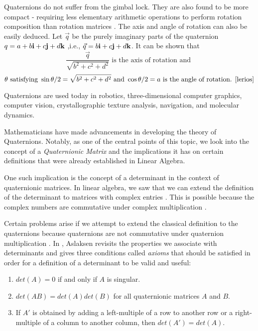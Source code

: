 
Quaternions do not suffer from the gimbal lock. They are also found to be more compact - requiring less elementary arithmetic operations to perform rotation composition than rotation matrices \cite{lerios}. The axis and angle of rotation can also be easily deduced. Let $\vec{q}$ be the purely imaginary parts of the quaternion $q = a + b\textbf{i} + c\textbf{j} + d\textbf{k} $ ,i.e., $\vec{q} = b\textbf{i} + c\textbf{j} + d\textbf{k}$. It can be shown that $$\frac{\vec{q}}{\sqrt{b^2+c^2+d^2}} \text{ is the axis of rotation and }$$ $$\theta \text{ satisfying } \sin{\theta/2} = \sqrt{b^2+c^2+d^2} \text{ and } \cos{\theta/2} = a \text{ is the angle of rotation. \cite{lerios}}$$

Quaternions are used today in robotics, three-dimensional computer graphics, computer vision, crystallographic texture analysis, navigation, and molecular dynamics. 

Mathematicians have made advancements in developing the theory of Quaternions. Notably, as one of the central points of this topic, we look into the concept of a \emph{Quaternionic Matrix} and the implications it has on certain definitions that were already established in Linear Algebra. 

One such implication is the concept of a determinant in the context of quaternionic matrices. In linear algebra, we saw that we can extend the definition of the determinant to matrices with complex entries \cite{stamaria}. This is possible because the complex numbers are commutative under complex multiplication \cite{aslaksen}. 

Certain problems arise if we attempt to extend the classical definition to the quaternions because quaternions are not commutative under quaternion multiplication \cite{aslaksen}. In \cite{aslaksen}, Aslaksen revisits the properties we associate with determinants and gives three conditions called \emph{axioms} that should be satisfied in order for a definition of a determinant to be valid and useful:
\begin{enumerate}
	\item $det(A) = 0$ if and only if $A$ is singular.
	\item $det(AB) = det(A)det(B)$ for all quaternionic matrices $A$ and $B$.
	\item If $A'$ is obtained by adding a left-multiple of a row to another row or a right-multiple of a column to another column, then $det(A')=det(A)$.
\end{enumerate}

